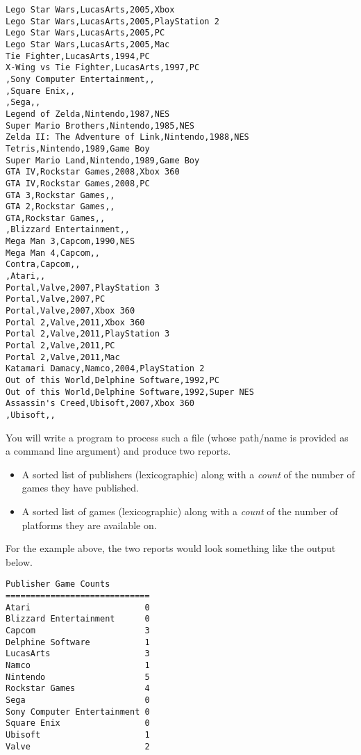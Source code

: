 \documentclass[12pt]{exam}
\begin{document}
\begin{questions}
\begin{verbatim}
Lego Star Wars,LucasArts,2005,Xbox
Lego Star Wars,LucasArts,2005,PlayStation 2
Lego Star Wars,LucasArts,2005,PC
Lego Star Wars,LucasArts,2005,Mac
Tie Fighter,LucasArts,1994,PC
X-Wing vs Tie Fighter,LucasArts,1997,PC
,Sony Computer Entertainment,,
,Square Enix,,
,Sega,,
Legend of Zelda,Nintendo,1987,NES
Super Mario Brothers,Nintendo,1985,NES
Zelda II: The Adventure of Link,Nintendo,1988,NES
Tetris,Nintendo,1989,Game Boy
Super Mario Land,Nintendo,1989,Game Boy
GTA IV,Rockstar Games,2008,Xbox 360
GTA IV,Rockstar Games,2008,PC
GTA 3,Rockstar Games,,
GTA 2,Rockstar Games,,
GTA,Rockstar Games,,
,Blizzard Entertainment,,
Mega Man 3,Capcom,1990,NES
Mega Man 4,Capcom,,
Contra,Capcom,,
,Atari,,
Portal,Valve,2007,PlayStation 3
Portal,Valve,2007,PC
Portal,Valve,2007,Xbox 360
Portal 2,Valve,2011,Xbox 360
Portal 2,Valve,2011,PlayStation 3
Portal 2,Valve,2011,PC
Portal 2,Valve,2011,Mac
Katamari Damacy,Namco,2004,PlayStation 2
Out of this World,Delphine Software,1992,PC
Out of this World,Delphine Software,1992,Super NES
Assassin's Creed,Ubisoft,2007,Xbox 360
,Ubisoft,,
\end{verbatim}

You will write a program to process such a file (whose path/name
is provided as a command line argument) and produce two reports.
\begin{itemize}
  \item A sorted list of publishers (lexicographic) along with
  	a \emph{count} of the number of games they have published.
  \item A sorted list of games (lexicographic) along with
  	a \emph{count} of the number of platforms they are available on.
\end{itemize}

For the example above, the two reports would look something like the
output below.

\begin{verbatim}
Publisher Game Counts
=============================
Atari                       0 
Blizzard Entertainment      0 
Capcom                      3 
Delphine Software           1 
LucasArts                   3 
Namco                       1 
Nintendo                    5 
Rockstar Games              4 
Sega                        0 
Sony Computer Entertainment 0 
Square Enix                 0 
Ubisoft                     1 
Valve                       2 


\end{verbatim}
\end{questions}
\end{document}

